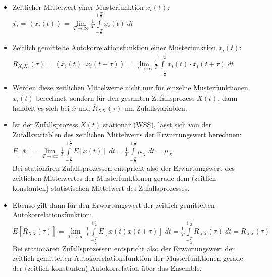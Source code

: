 \documentclass[10pt, a4paper]{article}
\begin{document}
\begin{itemize}
  \item Zeitlicher Mittelwert einer Musterfunktion $x_{i}(t)$: \\
        $\overline{x_{i}} = \left\langle x_{i}(t) \right\rangle = 
           \lim\limits_{T \rightarrow \infty}
             \frac{1}{T} \int\limits_{-\frac{T}{2}}^{+\frac{T}{2}} x_{i}(t) \; dt$
  \item Zeitlich gemittelte Autokorrelationsfunktion einer Musterfunktion $x_{i}(t)$: \\
        $\overline{R}_{X_{i}X_{i}}(\tau) = \left\langle x_{i}(t) \cdot x_{i}(t+\tau) \right\rangle = 
           \lim\limits_{T \rightarrow \infty}
             \frac{1}{T} \int\limits_{-\frac{T}{2}}^{+\frac{T}{2}} x_{i}(t) \cdot x_{i}(t + \tau) \; dt$
  \item Werden diese zeitlichen Mittelwerte nicht nur f\"ur einzelne Musterfunktionen $x_{i}(t)$ berechnet,
        sondern f\"ur den gesamten Zufallsprozess $X(t)$, dann handelt es sich bei $\overline{x}$ und
        $\overline{R}_{XX}(\tau)$ um Zufallsvariablen. 
  \item Ist der Zufallsprozess $X(t)$ station\"ar (WSS), l\"asst sich von der 
        Zufallsvariablen des zeitlichen Mittelwerts der Erwartungswert berechnen: \\
        $E[\overline{x}] = 
           \lim\limits_{T \rightarrow \infty}
             \frac{1}{T} \int\limits_{-\frac{T}{2}}^{+\frac{T}{2}} E[x(t)] \; dt = 
             \frac{1}{T} \int\limits_{-\frac{T}{2}}^{+\frac{T}{2}} \mu_{X} \; dt = \mu_{X}$ \\
        Bei station\"aren Zufallsprozessen entspricht also der Erwartungswert des zeitlichen
        Mittelwertes der Musterfunktionen gerade dem (zeitlich konstanten) statistischen Mittelwert
        des Zufallsprozesses.
  \item Ebenso gilt dann f\"ur den Erwartungswert der zeitlich gemittelten Autokorrelationsfunktion: \\
        $E[\overline{R}_{XX}(\tau)] = 
           \lim\limits_{T \rightarrow \infty}
             \frac{1}{T} \int\limits_{-\frac{T}{2}}^{+\frac{T}{2}} E[x(t)x(t+\tau)] \; dt =
             \frac{1}{T} \int\limits_{-\frac{T}{2}}^{+\frac{T}{2}} R_{XX}(\tau) \; dt = R_{XX}(\tau)$ \\
        Bei station\"aren Zufallsprozessen entspricht also der Erwartungswert der zeitlich gemittelten
        Autokorrelationsfunktion der Musterfunktionen gerade der (zeitlich konstanten) Autokorrelation
        \"uber das Ensemble.
\end{itemize} 
\end{document}

